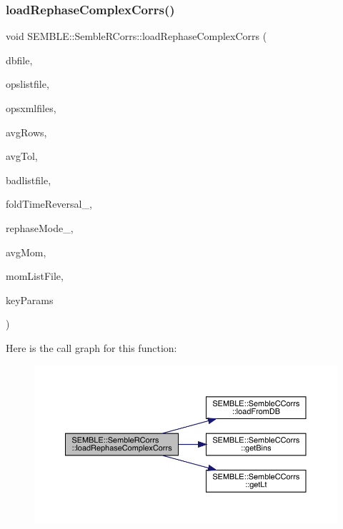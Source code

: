 \subsubsection{\texorpdfstring{loadRephaseComplexCorrs()}{loadRephaseComplexCorrs()}\hspace{0.1cm}{\footnotesize\ttfamily [2/2]}}
{\footnotesize\ttfamily void S\+E\+M\+B\+L\+E\+::\+Semble\+R\+Corrs\+::load\+Rephase\+Complex\+Corrs (\begin{DoxyParamCaption}\item[{const string \&}]{dbfile,  }\item[{const string \&}]{opslistfile,  }\item[{const Array$<$ string $>$ \&}]{opsxmlfiles,  }\item[{Array$<$ int $>$}]{avg\+Rows,  }\item[{double}]{avg\+Tol,  }\item[{const string \&}]{badlistfile,  }\item[{const string \&}]{fold\+Time\+Reversal\+\_\+,  }\item[{const string \&}]{rephase\+Mode\+\_\+,  }\item[{const bool}]{avg\+Mom,  }\item[{const string \&}]{mom\+List\+File,  }\item[{Input\+Props\+Redstar\+Keys\+\_\+t}]{key\+Params }\end{DoxyParamCaption})}

Here is the call graph for this function\+:
\nopagebreak
\begin{figure}[H]
\begin{center}
\leavevmode
\includegraphics[width=350pt]{d4/d78/classSEMBLE_1_1SembleRCorrs_a90df6abc8a20c39a8f0d5c04ad8efc97_cgraph}
\end{center}
\end{figure}
\mbox{\label{classSEMBLE_1_1SembleRCorrs_a7d8a67b5a5bf59715606b694890dba92}} 

